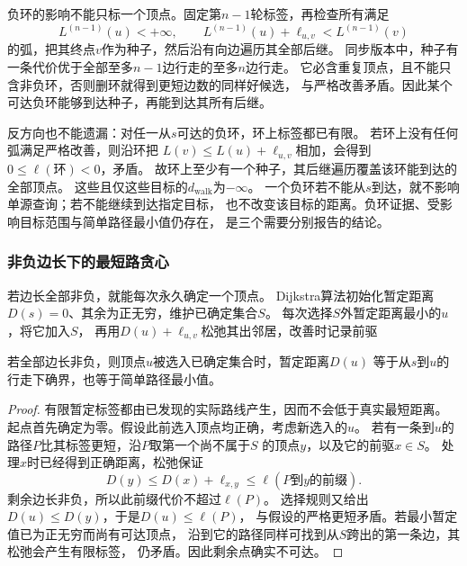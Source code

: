 负环的影响不能只标一个顶点。固定第\(n-1\)轮标签，再检查所有满足
\[
  L^{(n-1)}(u)<+\infty,\qquad
  L^{(n-1)}(u)+\ell_{u,v}<L^{(n-1)}(v)
\]
的弧，把其终点\(v\)作为种子，然后沿有向边遍历其全部后继。
同步版本中，种子有一条代价优于全部至多\(n-1\)边行走的至多\(n\)边行走。
它必含重复顶点，且不能只含非负环，否则删环就得到更短边数的同样好候选，
与严格改善矛盾。因此某个可达负环能够到达种子，再能到达其所有后继。

反方向也不能遗漏：对任一从\(s\)可达的负环，环上标签都已有限。
若环上没有任何弧满足严格改善，则沿环把
\(L(v)\leq L(u)+\ell_{u,v}\)相加，会得到\(0\leq\ell(\text{环})<0\)，矛盾。
故环上至少有一个种子，其后继遍历覆盖该环能到达的全部顶点。
这些且仅这些目标的\(d_{\mathrm{walk}}\)为\(-\infty\)。
一个负环若不能从\(s\)到达，就不影响单源查询；若不能继续到达指定目标，
也不改变该目标的距离。负环证据、受影响目标范围与简单路径最小值仍存在，
是三个需要分别报告的结论。

\subsubsection{非负边长下的最短路贪心}

若边长全部非负，就能每次永久确定一个顶点。
Dijkstra算法初始化暂定距离\(D(s)=0\)、其余为正无穷，维护已确定集合\(S\)。
每次选择\(S\)外暂定距离最小的\(u\)，将它加入\(S\)，
再用\(D(u)+\ell_{u,v}\)松弛其出邻居，改善时记录前驱

\begin{theorem}[Dijkstra算法的贪心正确性]
  \label{thm:graph-theory-dijkstra-correctness}
  若全部边长非负，则顶点\(u\)被选入已确定集合时，暂定距离\(D(u)\)
  等于从\(s\)到\(u\)的行走下确界，也等于简单路径最小值。
\end{theorem}

\begin{proof}
有限暂定标签都由已发现的实际路线产生，因而不会低于真实最短距离。
起点首先确定为零。假设此前选入顶点均正确，考虑新选入的\(u\)。
若有一条到\(u\)的路径\(P\)比其标签更短，沿\(P\)取第一个尚不属于\(S\)
的顶点\(y\)，以及它的前驱\(x\in S\)。
处理\(x\)时已经得到正确距离，松弛保证
\[
  D(y)\leq D(x)+\ell_{x,y}
  \leq \ell(P\text{到}y\text{的前缀}).
\]
剩余边长非负，所以此前缀代价不超过\(\ell(P)\)。
选择规则又给出\(D(u)\leq D(y)\)，于是\(D(u)\leq\ell(P)\)，
与假设的严格更短矛盾。若最小暂定值已为正无穷而尚有可达顶点，
沿到它的路径同样可找到从\(S\)跨出的第一条边，其松弛会产生有限标签，
仍矛盾。因此剩余点确实不可达。
\end{proof}

